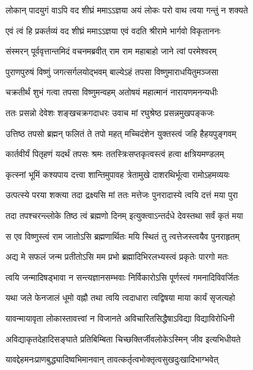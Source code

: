 \twolineshloka
{लोकान् पादयुगं वाऽपि वद शीघ्रं ममाऽऽज्ञया}
{अयं लोकः परो वाथ त्वया गन्तुं न शक्यते} %

\twolineshloka
{एवं त्वं हि प्रकर्तव्यं वद शीघ्रं ममाऽऽज्ञया}
{एवं वदति श्रीरामे भार्गवो विकृताननः} %

\twolineshloka
{संस्मरन् पूर्ववृत्तान्तमिदं वचनमब्रवीत्}
{राम राम महाबाहो जाने त्वां परमेश्वरम्} %

\twolineshloka
{पुराणपुरुषं विष्णुं जगत्सर्गलयोद्भवम्}
{बाल्येऽहं तपसा विष्णुमाराधयितुमञ्जसा} %

\twolineshloka
{चक्रतीर्थं शुभं गत्वा तपसा विष्णुमन्वहम्}
{अतोषयं महात्मानं नारायणमनन्यधीः} %

\twolineshloka
{ततः प्रसन्नो देवेशः शङ्खचक्रगदाधरः}
{उवाच मां रघुश्रेष्ठ प्रसन्नमुखपङ्कजः} %


\twolineshloka
{उत्तिष्ठ तपसो ब्रह्मन् फलितं ते तपो महत्}
{मच्चिदंशेन युक्तस्त्वं जहि हैहयपुङ्गवम्} %

\twolineshloka
{कार्तवीर्यं पितृहणं यदर्थं तपसः श्रमः}
{ततस्त्रिःसप्तकृत्वस्त्वं हत्वा क्षत्रियमण्डलम्} %

\twolineshloka
{कृत्स्नां भूमिं कश्यपाय दत्त्वा शान्तिमुपावह}
{त्रेतामुखे दाशरथिर्भूत्वा रामोऽहमव्ययः} %

\twolineshloka
{उत्पत्स्ये परया शक्त्या तदा द्रक्ष्यसि मां ततः}
{मत्तेजः पुनरादास्ये त्वयि दत्तं मया पुरा} %

\twolineshloka
{तदा तपश्चरन्ल्लोके तिष्ठ त्वं ब्रह्मणो दिनम्}
{इत्युक्त्वाऽन्तर्दधे देवस्तथा सर्वं कृतं मया} %

\twolineshloka
{स एव विष्णुस्त्वं राम जातोऽसि ब्रह्मणार्थितः}
{मयि स्थितं तु त्वत्तेजस्त्वयैव पुनराहृतम्} %

\twolineshloka
{अद्य मे सफलं जन्म प्रतीतोऽसि मम प्रभो}
{ब्रह्मादिभिरलभ्यस्त्वं प्रकृतेः पारगो मतः} %

\twolineshloka
{त्वयि जन्मादिषड्भावा न सन्त्यज्ञानसम्भवाः}
{निर्विकारोऽसि पूर्णस्त्वं गमनादिविवर्जितः} %

\twolineshloka
{यथा जले फेनजालं धूमो वह्नौ तथा त्वयि}
{त्वदाधारा त्वद्विषया माया कार्यं सृजत्यहो} %

\twolineshloka
{यावन्मायावृता लोकास्तावत्त्वां न विजानते}
{अविचारितसिद्धैषाऽविद्या विद्याविरोधिनी} %

\twolineshloka
{अविद्याकृतदेहादिसङ्घाते प्रतिबिम्बिता}
{चिच्छक्तिर्जीवलोकेऽस्मिन् जीव इत्यभिधीयते} %

\twolineshloka
{यावद्देहमनःप्राणबुद्ध्यादिष्वभिमानवान्}
{तावत्कर्तृत्वभोक्तृत्वसुखदुःखादिभाग्भवेत्} %

